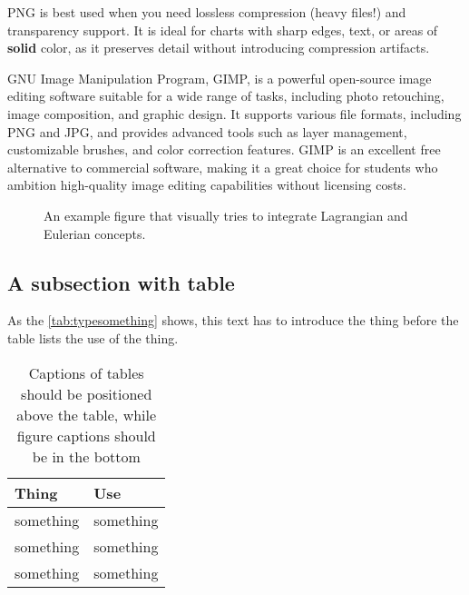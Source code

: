 PNG is best used when you need lossless compression (heavy files!) and transparency support. It is ideal for charts with sharp edges, text, or areas of \textbf{solid} color, as it preserves detail without introducing compression artifacts.

GNU Image Manipulation Program, GIMP, is a powerful open-source image editing software suitable for a wide range of tasks, including photo retouching, image composition, and graphic design. It supports various file formats, including PNG and JPG, and provides advanced tools such as layer management, customizable brushes, and color correction features. GIMP is an excellent free alternative to commercial software, making it a great choice for students who ambition high-quality image editing capabilities without licensing costs.


\begin{figure}[htp]
	\begin{center}
		\begin{minipage}{\textwidth}
			\centering
			\caption[An example figure.]{An example figure that visually tries to integrate Lagrangian and Eulerian concepts.}
			\label{fig:example}
		\end{minipage}
	\end{center}
\end{figure}

		
\subsection{A subsection with table}
\label{subsec:somesome}
		
As the \autoref{tab:typesomething} shows, this text has to introduce the thing before the table lists the use of the thing.
		
		
\begin{table}[hb] %
	\centering
	\caption{Captions of tables should be positioned above the table, while figure captions should be in the bottom}
	\begin{tabular}{ll}
		\hline
		\textbf{Thing} & \textbf{Use} \\
		\hline
		something & something \\
		something & something \\
		something & something \\
		\hline
	\end{tabular}
	\label{tab:typesomething}
\end{table}
		
